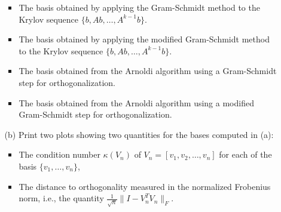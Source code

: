 \documentclass[10pt]{report}
\begin{document}
\begin{enumerate}
\begin{itemize}
\begin{itemize}
\item The basis obtained by applying the Gram-Schmidt method to the Krylov sequence $\{b, Ab, \ldots, A^{k-1}b\}.$ 

\item The basis obtained by applying the modified Gram-Schmidt method to the Krylov sequence $\{b, Ab, \ldots, A^{k-1}b\}$.
 
\item The basis obtained from  the Arnoldi algorithm using a Gram-Schmidt step for orthogonalization.

\item The basis obtained from the Arnoldi algorithm using a modified Gram-Schmidt step for orthogonalization.
\end{itemize}

\item[(b)] Print two plots showing two quantities for the bases computed in (a):
\begin{itemize}
\item The condition number $\kappa(V_n)$ of $V_n=[v_1, v_2, \ldots, v_n]$ for each of the basis $\{v_1, \ldots, v_n\}$,

\item The distance to orthogonality measured in the normalized Frobenius norm, i.e., the quantity $\frac{1}{\sqrt{n}}\|I-V_n^TV_n\|_F$. 
\end{itemize}


\end{itemize}

\end{enumerate}
\end{document}
